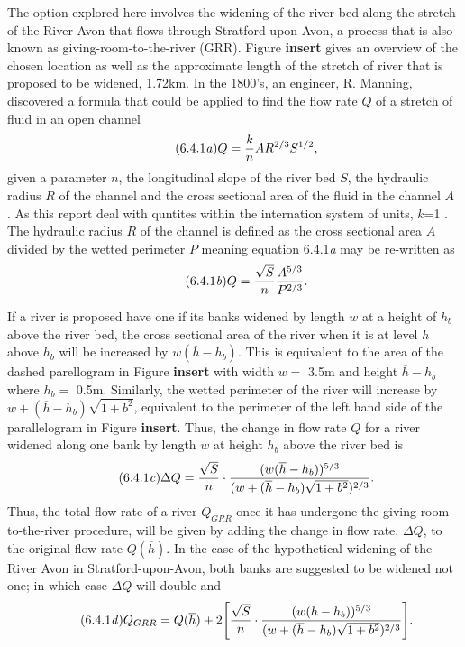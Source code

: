 \documentclass[11pt,a4paper]{article}
\begin{document}
\noindent The option explored here involves the widening of the river bed along the stretch of the River Avon that flows through Stratford-upon-Avon, a process that is also known as giving-room-to-the-river (GRR). Figure \textbf{insert} gives an overview of the chosen location as well as the approximate length of the stretch of river that is proposed to be widened, 1.72km. In the 1800's, an engineer, R. Manning, discovered a formula that could be applied to find the flow rate $Q$ of a stretch of fluid in an open channel 
\begin{equation}\tag{6.4.1\textit{a}}
Q=\frac{k}{n}AR^{2/3}S^{1/2},
\end{equation}
given a parameter $n$, the longitudinal slope of the river bed $S$, the hydraulic radius $R$ of the channel and the cross sectional area of the fluid in the channel $A$ \cite{manning}. As this report deal with quntites within the internation system of units, $k$=1 \cite{manning}. The hydraulic radius $R$ of the channel is defined as the cross sectional area $A$  divided by the wetted perimeter $P$ meaning equation 6.4.1\textit{a} may be re-written as
\begin{equation}\tag{6.4.1\textit{b}}
Q=\frac{\sqrt{S}}{n}\frac{A^{5/3}}{P^{2/3}}.
\end{equation}

If a river is proposed have one if its banks widened by length $w$ at a height of $h_b$ above the river bed, the cross sectional area of the river when it is at level $\overline{h}$ above $h_b$ will be increased by $w(\overline{h}-h_b)$. This is equivalent to the area of the dashed parellogram in Figure \textbf{insert} with width $w=$ 3.5m and height $\overline{h}-h_b$ where $h_b=$ 0.5m. Similarly, the wetted perimeter of the river will increase by $w+(\overline{h}-h_b)\sqrt{1+b^2}$, equivalent to the perimeter of the left hand side of the parallelogram in Figure \textbf{insert}. Thus, the change in flow rate $Q$ for a river widened along one bank by length $w$ at height $h_b$ above the river bed is
\begin{equation}\tag{6.4.1\textit{c}}
\Delta Q=\frac{\sqrt{S}}{n}\cdot\frac{(w(\overline{h}-h_b))^{5/3}}{(w+(\overline{h}-h_b)\sqrt{1+b^2})^{2/3}}.
\end{equation}
Thus, the total flow rate of a river $Q_{GRR}$ once it has undergone the giving-room-to-the-river procedure, will be given by adding the change in flow rate, $\Delta Q$, to the original flow rate $Q(\overline{h})$. In the case of the hypothetical widening of the River Avon in Stratford-upon-Avon, both banks are suggested to be widened not one{;} in which case $\Delta Q$ will double and
\begin{equation}\tag{6.4.1\textit{d}}
Q_{GRR}=Q(\overline{h})+2\Bigg[\frac{\sqrt{S}}{n}\cdot\frac{(w(\overline{h}-h_b))^{5/3}}{(w+(\overline{h}-h_b)\sqrt{1+b^2})^{2/3}}\Bigg].
\end{equation}
\end{document}
